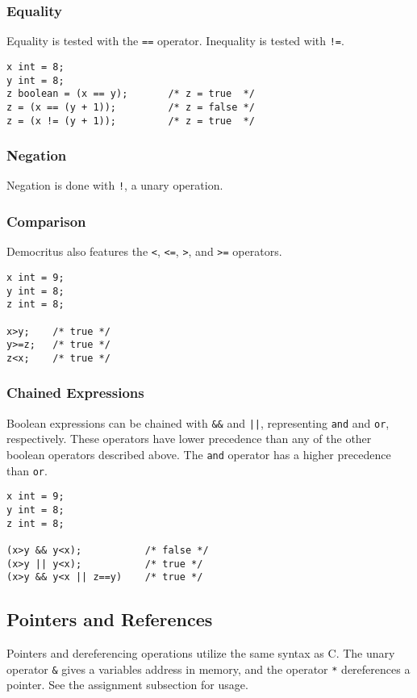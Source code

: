         \subsubsection{Equality}
            Equality is tested with the \texttt{==} operator. Inequality is tested with \texttt{!=}. 
            \begin{lstlisting}
x int = 8;
y int = 8;
z boolean = (x == y);		/* z = true  */
z = (x == (y + 1));			/* z = false */
z = (x != (y + 1));			/* z = true  */
			\end{lstlisting}
			
		\subsubsection{Negation}
			Negation is done with \texttt{!}, a unary operation.

        \subsubsection{Comparison}
            Democritus also features the \verb|<|, \verb|<=|, \verb|>|, and \verb|>=| operators.  
            
            \begin{lstlisting}
x int = 9;
y int = 8;
z int = 8;

x>y;    /* true */
y>=z;   /* true */
z<x;    /* true */
            \end{lstlisting}

        \subsubsection{Chained Expressions}
            Boolean expressions can be chained with \verb|&&| and \verb!||!, representing \texttt{and} and \texttt{or}, respectively. These operators have lower precedence than any of the other boolean operators described above. The \texttt{and} operator has a higher precedence than \texttt{or}.

            \begin{lstlisting}
x int = 9;
y int = 8;
z int = 8;

(x>y && y<x);			/* false */
(x>y || y<x);			/* true */
(x>y && y<x || z==y)	/* true */
            \end{lstlisting}
            
	\subsection{Pointers and References}
		Pointers and dereferencing operations utilize the same syntax as C. The unary operator \texttt{\&} gives a variables address in memory, and the operator \texttt{*} dereferences a pointer. See the assignment subsection for usage.
		
